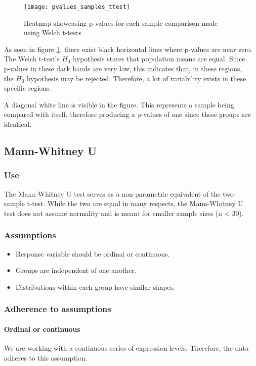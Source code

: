\begin{figure}[H]
    \centering
    \texttt{[image: pvalues\_samples\_ttest]}
    \caption{Heatmap showcasing p-values for each sample comparison made using Welch t-tests}
    \label{plt:ttesthm}
\end{figure}

As seen in figure \ref{plt:ttesthm}, there exist black horizontal lines where p-values are near zero.
The Welch t-test's $H_0$ hypothesis states that population means are equal.
Since p-values in these dark bands are very low, this indicates that, in these regions, the $H_0$ hypothesis may be rejected.
Therefore, a lot of variability exists in these specific regions.
\par A diagonal white line is visible in the figure.
This represents a sample being compared with itself, therefore producing a p-values of one since these groups are identical.

\subsection{Mann-Whitney U}

\subsubsection{Use}
The Mann-Whitney U test serves as a non-parametric equivalent of the two-sample t-test.
While the two are equal in many respects, the Mann-Whitney U test does not assume normality and is meant for smaller sample sizes (n < 30).

\subsubsection{Assumptions}
\begin{itemize}
    \item Response variable should be ordinal or continuous.
    \item Groups are independent of one another.
    \item Distributions within each group have similar shapes.
\end{itemize}

\subsubsection{Adherence to assumptions}
\paragraph{Ordinal or continuous}
We are working with a continuous series of expression levels.
Therefore, the data adheres to this assumption.

